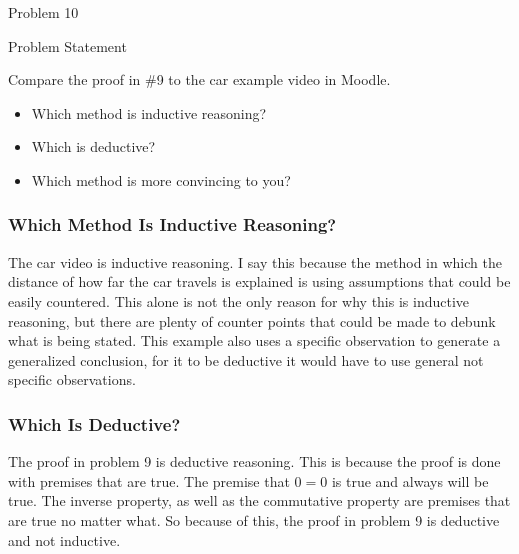 \begin{problem}{Problem 10}
    \begin{statement}{Problem Statement}

        Compare the proof in \#9 to the car example video in Moodle.

        \begin{itemize}
            \item Which method is inductive reasoning?
            \item Which is deductive?
            \item Which method is more convincing to you?
        \end{itemize}

    \end{statement}

    \begin{Highlight}[Solution]

        \subsubsection*{Which Method Is Inductive Reasoning?}

        The car video is inductive reasoning. I say this because the method in which the distance of how far the car travels is explained is using assumptions that could be easily
        countered. This alone is not the only reason for why this is inductive reasoning, but there are plenty of counter points that could be made to debunk what is being stated.
        This example also uses a specific observation to generate a generalized conclusion, for it to be deductive it would have to use general not specific observations.

        \vspace*{1em}

        \subsubsection*{Which Is Deductive?}

        The proof in problem 9 is deductive reasoning. This is because the proof is done with premises that are true. The premise that $0 = 0$ is true and always will be true. The 
        inverse property, as well as the commutative property are premises that are true no matter what. So because of this, the proof in problem 9 is deductive and not inductive.

        \vspace*{1em}


\end{Highlight}
\end{problem}
